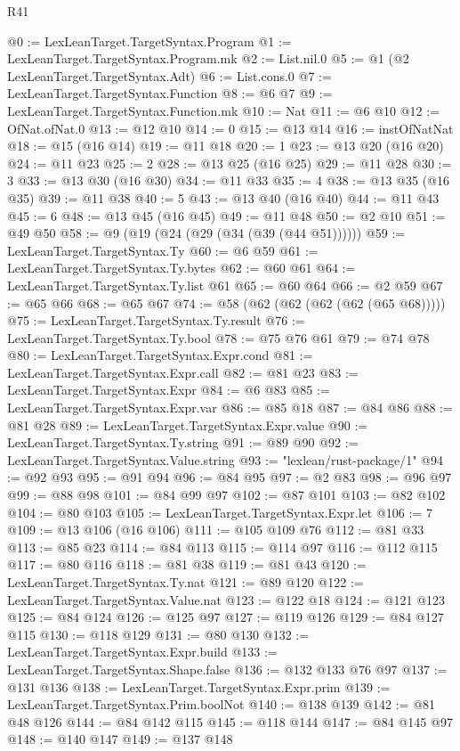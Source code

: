 \begin{lexlean}{R41}
\begin{coremodule}
@0 := LexLeanTarget.TargetSyntax.Program
@1 := LexLeanTarget.TargetSyntax.Program.mk
@2 := List.nil.{0}
@5 := @1 (@2 LexLeanTarget.TargetSyntax.Adt)
@6 := List.cons.{0}
@7 := LexLeanTarget.TargetSyntax.Function
@8 := @6 @7
@9 := LexLeanTarget.TargetSyntax.Function.mk
@10 := Nat
@11 := @6 @10
@12 := OfNat.ofNat.{0}
@13 := @12 @10
@14 := 0
@15 := @13 @14
@16 := instOfNatNat
@18 := @15 (@16 @14)
@19 := @11 @18
@20 := 1
@23 := @13 @20 (@16 @20)
@24 := @11 @23
@25 := 2
@28 := @13 @25 (@16 @25)
@29 := @11 @28
@30 := 3
@33 := @13 @30 (@16 @30)
@34 := @11 @33
@35 := 4
@38 := @13 @35 (@16 @35)
@39 := @11 @38
@40 := 5
@43 := @13 @40 (@16 @40)
@44 := @11 @43
@45 := 6
@48 := @13 @45 (@16 @45)
@49 := @11 @48
@50 := @2 @10
@51 := @49 @50
@58 := @9 (@19 (@24 (@29 (@34 (@39 (@44 @51))))))
@59 := LexLeanTarget.TargetSyntax.Ty
@60 := @6 @59
@61 := LexLeanTarget.TargetSyntax.Ty.bytes
@62 := @60 @61
@64 := LexLeanTarget.TargetSyntax.Ty.list @61
@65 := @60 @64
@66 := @2 @59
@67 := @65 @66
@68 := @65 @67
@74 := @58 (@62 (@62 (@62 (@62 (@65 @68)))))
@75 := LexLeanTarget.TargetSyntax.Ty.result
@76 := LexLeanTarget.TargetSyntax.Ty.bool
@78 := @75 @76 @61
@79 := @74 @78
@80 := LexLeanTarget.TargetSyntax.Expr.cond
@81 := LexLeanTarget.TargetSyntax.Expr.call
@82 := @81 @23
@83 := LexLeanTarget.TargetSyntax.Expr
@84 := @6 @83
@85 := LexLeanTarget.TargetSyntax.Expr.var
@86 := @85 @18
@87 := @84 @86
@88 := @81 @28
@89 := LexLeanTarget.TargetSyntax.Expr.value
@90 := LexLeanTarget.TargetSyntax.Ty.string
@91 := @89 @90
@92 := LexLeanTarget.TargetSyntax.Value.string
@93 := "lexlean/rust-package/1"
@94 := @92 @93
@95 := @91 @94
@96 := @84 @95
@97 := @2 @83
@98 := @96 @97
@99 := @88 @98
@101 := @84 @99 @97
@102 := @87 @101
@103 := @82 @102
@104 := @80 @103
@105 := LexLeanTarget.TargetSyntax.Expr.let
@106 := 7
@109 := @13 @106 (@16 @106)
@111 := @105 @109 @76
@112 := @81 @33
@113 := @85 @23
@114 := @84 @113
@115 := @114 @97
@116 := @112 @115
@117 := @80 @116
@118 := @81 @38
@119 := @81 @43
@120 := LexLeanTarget.TargetSyntax.Ty.nat
@121 := @89 @120
@122 := LexLeanTarget.TargetSyntax.Value.nat
@123 := @122 @18
@124 := @121 @123
@125 := @84 @124
@126 := @125 @97
@127 := @119 @126
@129 := @84 @127 @115
@130 := @118 @129
@131 := @80 @130
@132 := LexLeanTarget.TargetSyntax.Expr.build
@133 := LexLeanTarget.TargetSyntax.Shape.false
@136 := @132 @133 @76 @97
@137 := @131 @136
@138 := LexLeanTarget.TargetSyntax.Expr.prim
@139 := LexLeanTarget.TargetSyntax.Prim.boolNot
@140 := @138 @139
@142 := @81 @48 @126
@144 := @84 @142 @115
@145 := @118 @144
@147 := @84 @145 @97
@148 := @140 @147
@149 := @137 @148

\end{coremodule}
\end{lexlean}
